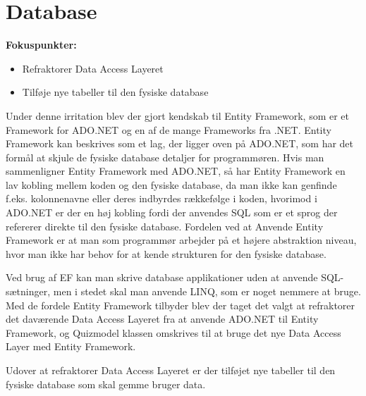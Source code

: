 \chapter{Database}

\textbf{Fokuspunkter:}
	\begin{itemize}
			\item Refraktorer Data Access Layeret 
			\item Tilføje nye tabeller til den fysiske database
	\end{itemize}


Under denne irritation blev der gjort kendskab til Entity Framework, som er et Framework for ADO.NET og en af de mange Frameworks fra .NET. Entity Framework kan beskrives som et lag, der ligger oven på ADO.NET, som har det formål at skjule de fysiske database detaljer for programmøren. Hvis man sammenligner Entity Framework med ADO.NET, så har Entity Framework en lav kobling mellem koden og den fysiske database, da man ikke kan genfinde f.eks. kolonnenavne eller deres indbyrdes rækkefølge i koden, hvorimod i ADO.NET er der en høj kobling fordi der anvendes SQL som er et sprog der refererer direkte til den fysiske database. Fordelen ved at Anvende Entity Framework er at man som programmør arbejder på et højere abstraktion niveau, hvor man ikke har behov for at kende strukturen for den fysiske database. 

Ved brug af EF kan man skrive database applikationer uden at anvende SQL-sætninger, men i stedet skal man anvende LINQ, som er noget nemmere at bruge. Med de fordele Entity Framework tilbyder blev der taget det valgt at refraktorer det daværende Data Access Layeret fra at anvende ADO.NET til Entity Framework, og Quizmodel klassen omskrives til at bruge det nye Data Access Layer med Entity Framework. 

Udover at refraktorer Data Access Layeret er der tilføjet nye tabeller til den fysiske database som skal gemme bruger data. 

